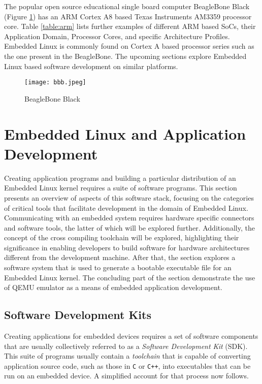 The popular open source educational single board computer BeagleBone Black (Figure \ref{fig:bbb}) has an ARM Cortex A8 based Texas Instruments AM3359 processor core. Table \ref{table:arm} lists further examples of different ARM based SoCs, their Application Domain, Processor Cores, and specific Architecture Profiles. Embedded Linux is commonly found on Cortex A based processor series such as the one present in the BeagleBone. The upcoming sections explore Embedded Linux based software development on similar platforms.

\begin{figure}[h]
	\centering
	\texttt{[image: bbb.jpeg]}
	\caption{BeagleBone Black}
	\label{fig:bbb}
\end{figure}

\section{Embedded Linux and Application Development}

Creating application programs and building a particular distribution of an Embedded Linux kernel requires a suite of software programs. This section presents an overview of aspects of this software stack, focusing on the categories of critical tools that facilitate development in the domain of Embedded Linux. Communicating with an embedded system requires hardware specific connectors and software tools, the latter of which will be explored further. Additionally, the concept of the cross compiling toolchain will be explored, highlighting their significance in enabling developers to build software for hardware architectures different from the development machine. After that, the section explores a software system that is used to generate a bootable executable file for an Embedded Linux kernel. The concluding part of the section demonstrate the use of QEMU emulator as a means of embedded application development.

\subsection{Software Development Kits}

Creating applications for embedded devices requires a set of software components that are usually collectively referred to as a \textit{Software Development Kit} (SDK). This suite of programs usually contain a \textit{toolchain} that is capable of converting application source code, such as those in \texttt{C}  or \texttt{C++}, into executables that can be run on an embedded device. A simplified account for that process now follows.

